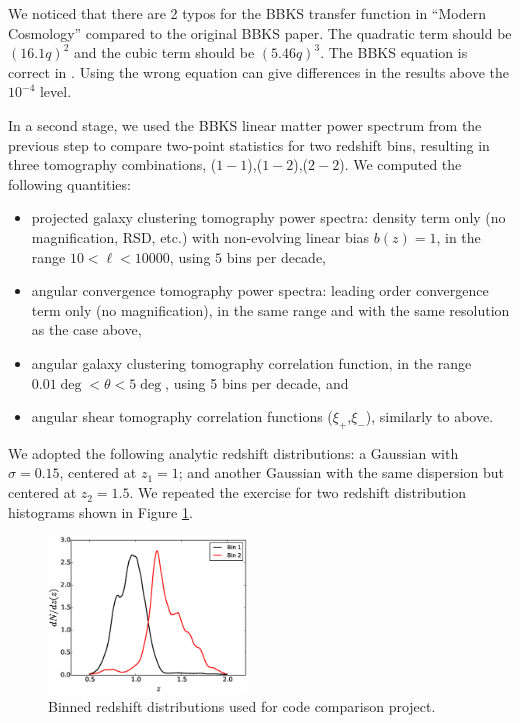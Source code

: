 \documentclass[\docopts]{\docclass}
\begin{document}
We noticed that there are 2 typos for the BBKS transfer function in ``Modern Cosmology'' \citep{DodelsonBook} compared to the original BBKS paper. The quadratic term should be $(16.1q)^2$ and the cubic term should be $(5.46q)^3$. The BBKS equation is correct in \citet{PeacockBook}. Using the wrong equation can give differences in the results above the $10^{-4}$ level.

In a second stage, we used the BBKS linear matter power spectrum from the previous step to compare two-point statistics for two redshift bins, resulting in three tomography combinations, ($1-1$),($1-2$),($2-2$). We computed the following quantities:
\begin{itemize}
\item projected galaxy clustering tomography power spectra: density term only (no magnification, RSD, etc.) with non-evolving linear bias $b(z) = 1$, in the range $10 < \ell < 10000$, using $5$ bins per decade,
\item angular convergence tomography power spectra: leading order convergence term only (no magnification), in the same range and with the same resolution as the case above, 
\item angular galaxy clustering tomography correlation function, in the range $0.01 \deg < \theta < 5 \deg$, using 5 bins per decade, and 
\item angular shear tomography correlation functions ($\xi_+$,$\xi_-$), similarly to above.
\end{itemize}
We adopted the following analytic redshift distributions: a Gaussian with $\sigma = 0.15$, centered at $z_1 = 1$; and another Gaussian with the same dispersion but centered at $z_2 = 1.5$. We repeated the exercise for two redshift distribution histograms shown in Figure \ref{fig:zhistos}.

\begin{figure}
\centering
\includegraphics[width=0.47\textwidth]{zdist.eps}
\caption{Binned redshift distributions used for code comparison project.}
\label{fig:zhistos}
\end{figure}
\end{document}
